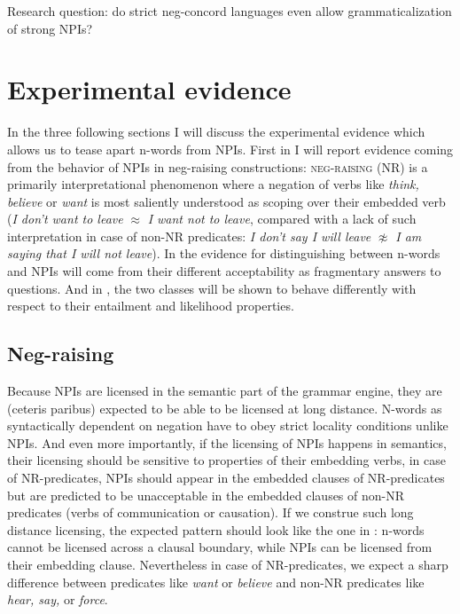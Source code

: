 \documentclass[output=paper,
]{langscibook}
\begin{document}
\eanoraggedright\label{ex-23} Research question: do strict neg-concord languages even allow grammaticalization of strong NPIs?
\z

\section{Experimental evidence}\label{experimental-evidence}

In the three following sections I will discuss the experimental evidence which allows us to tease apart n-words from NPIs. First in  I will report evidence coming from the behavior of NPIs in neg-raising constructions: \textsc{neg-raising} (NR) is a primarily interpretational phenomenon where a negation of verbs like \textit{think, believe} or \textit{want} is most saliently understood as scoping over their embedded verb (\textit{I don't want to leave} $\approx$ \textit{I want not to leave}, compared with a lack of such interpretation in case of non-NR predicates: \textit{I don't say I will leave} $\not\approx$ \textit{I am saying that I will not leave}). In  the evidence for distinguishing between n-words and NPIs will come from their different acceptability as fragmentary answers to questions. And in , the two classes will be shown to behave differently with respect to their entailment and likelihood properties.

\subsection{Neg-raising}\label{neg-raising}

Because NPIs are licensed in the semantic part of the grammar engine, they are (ceteris paribus) expected to be able to be licensed at long distance. N-words as syntactically dependent on negation have to obey strict locality conditions unlike NPIs. And even more importantly, if the licensing of NPIs happens in semantics, their licensing should be sensitive to properties of their embedding verbs, in case of NR-predicates, NPIs should appear in the embedded clauses of NR-predicates but are predicted to be unacceptable in the embedded clauses of non-NR predicates (verbs of communication or causation). If we construe such long distance licensing, the expected pattern should look like the one in : n-words cannot be licensed across a clausal boundary, while NPIs can be licensed from their embedding clause. Nevertheless in case of NR-predicates, we expect a sharp difference between predicates like \textit{want} or \textit{believe} and non-NR predicates like \textit{hear, say,} or \textit{force}.
\end{document}
